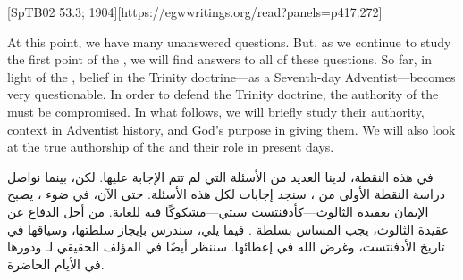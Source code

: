 [SpTB02 53.3; 1904][https://egwwritings.org/read?panels=p417.272]


At this point, we have many unanswered questions. But, as we continue to study the first point of the , we will find answers to all of these questions. So far, in light of the , belief in the Trinity doctrine—as a Seventh-day Adventist—becomes very questionable. In order to defend the Trinity doctrine, the authority of the  must be compromised. In what follows, we will briefly study their authority, context in Adventist history, and God’s purpose in giving them. We will also look at the true authorship of the  and their role in present days.


في هذه النقطة، لدينا العديد من الأسئلة التي لم تتم الإجابة عليها. لكن، بينما نواصل دراسة النقطة الأولى من ، سنجد إجابات لكل هذه الأسئلة. حتى الآن، في ضوء ، يصبح الإيمان بعقيدة الثالوث—كأدفنتست سبتي—مشكوكًا فيه للغاية. من أجل الدفاع عن عقيدة الثالوث، يجب المساس بسلطة . فيما يلي، سندرس بإيجاز سلطتها، وسياقها في تاريخ الأدفنتست، وغرض الله في إعطائها. سننظر أيضًا في المؤلف الحقيقي لـ ودورها في الأيام الحاضرة.


